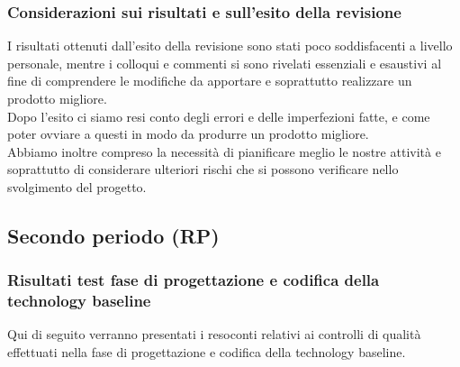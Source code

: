\documentclass[../piano_di_qualifica.tex]{subfiles}
\begin{document}
\subsubsection{Considerazioni sui risultati e sull’esito della revisione}
I risultati ottenuti dall’esito della revisione sono stati poco soddisfacenti a livello personale, mentre i colloqui e commenti si sono rivelati essenziali e esaustivi al fine di comprendere le modifiche da apportare e soprattutto realizzare un prodotto migliore. \\
Dopo l'esito ci siamo resi conto degli errori e delle imperfezioni fatte, e come poter ovviare a questi in modo da produrre un prodotto migliore. \\
Abbiamo inoltre compreso la necessità di pianificare meglio le nostre attività e soprattutto di considerare ulteriori rischi che si possono verificare nello svolgimento del progetto.


\subsection{Secondo periodo (RP)}
\label{sub:periodo-RP}
\subsubsection{Risultati test fase di progettazione e codifica della technology baseline}
Qui di seguito verranno presentati i resoconti relativi ai controlli di qualità effettuati nella fase di progettazione e codifica della technology baseline.
\end{document}

